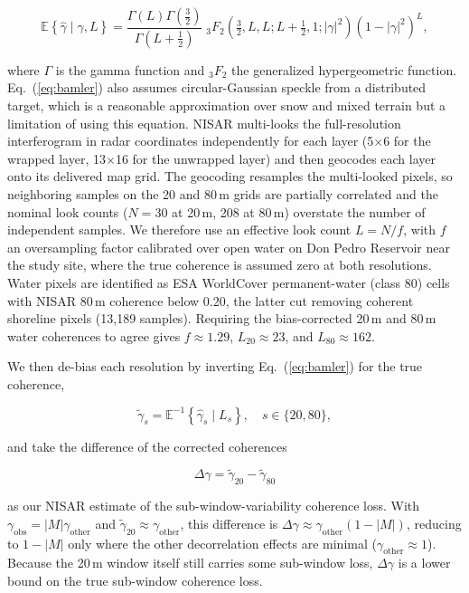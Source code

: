 \documentclass[tc, manuscript]{copernicus}
\begin{document}
\begin{equation}
\mathbb{E}\!\left\{\hat{\gamma}\mid\gamma,L\right\}
= \frac{\Gamma(L)\Gamma\!\left(\tfrac{3}{2}\right)}{\Gamma\!\left(L+\tfrac{1}{2}\right)}\;
{}_{3}F_{2}\!\left(\tfrac{3}{2},L,L;L+\tfrac{1}{2},1;|\gamma|^{2}\right)
\left(1-|\gamma|^{2}\right)^{L},
\label{eq:bamler}
\end{equation}

\noindent where $\Gamma$ is the gamma function and ${}_{3}F_{2}$ the generalized hypergeometric function. Eq.~(\ref{eq:bamler}) also assumes circular-Gaussian speckle from a distributed target, which is a reasonable approximation over snow and mixed terrain but a limitation of using this equation. NISAR multi-looks the full-resolution interferogram in radar coordinates independently for each layer (5$\times$6 for the wrapped layer, 13$\times$16 for the unwrapped layer) and then geocodes each layer onto its delivered map grid. The geocoding resamples the multi-looked pixels, so neighboring samples on the 20 and 80\,\unit{m} grids are partially correlated and the nominal look counts ($N = 30$ at 20\,\unit{m}, 208 at 80\,\unit{m}) overstate the number of independent samples. We therefore use an effective look count $L=N/f$, with $f$ an oversampling factor calibrated over open water on Don Pedro Reservoir near the study site, where the true coherence is assumed zero at both resolutions. Water pixels are identified as ESA WorldCover permanent-water (class 80) cells with NISAR 80\,\unit{m} coherence below 0.20, the latter cut removing coherent shoreline pixels (13,189 samples). Requiring the bias-corrected 20\,\unit{m} and 80\,\unit{m} water coherences to agree gives $f \approx 1.29$, $L_{20} \approx 23$, and $L_{80} \approx 162$.

We then de-bias each resolution by inverting Eq.~(\ref{eq:bamler}) for the true coherence,

  \begin{equation}
    \tilde{\gamma}_{s} = \mathbb{E}^{-1}\!\left\{\hat{\gamma}_{s}\mid L_{s}\right\},
    \quad s\in\{20,80\},
    \label{eq:debias}
  \end{equation}

\noindent and take the difference of the corrected coherences

  \begin{equation}
    \Delta\gamma = \tilde{\gamma}_{20} - \tilde{\gamma}_{80}
    \label{eq:cohdiff}
  \end{equation}

\noindent as our NISAR estimate of the sub-window-variability coherence loss. With $\gamma_\mathrm{obs}=|M| \gamma_\mathrm{other}$ and $\tilde\gamma_{20}\approx\gamma_\mathrm{other}$, this difference is $\Delta\gamma \approx \gamma_\mathrm{other}(1-|M|)$, reducing to $1-|M|$ only where the other decorrelation effects are minimal ($\gamma_\mathrm{other} \approx 1$). Because the 20\,\unit{m} window itself still carries some sub-window loss, $\Delta\gamma$ is a lower bound on the true sub-window coherence loss.
\end{document}
